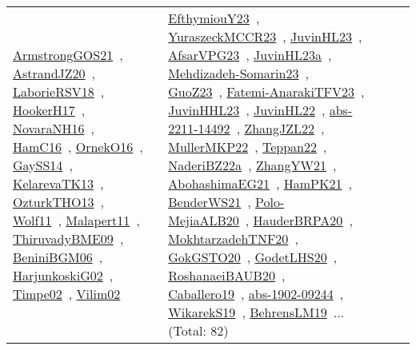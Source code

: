 {\begin{longtable}{lp{3cm}>{\raggedright\arraybackslash}p{6cm}>{\raggedright\arraybackslash}p{6cm}>{\raggedright\arraybackslash}p{8cm}}
\href{../works/ArmstrongGOS21.pdf}{ArmstrongGOS21}~\cite{ArmstrongGOS21}, \href{../works/AstrandJZ20.pdf}{AstrandJZ20}~\cite{AstrandJZ20}, \href{../works/LaborieRSV18.pdf}{LaborieRSV18}~\cite{LaborieRSV18}, \href{../works/HookerH17.pdf}{HookerH17}~\cite{HookerH17}, \href{../works/NovaraNH16.pdf}{NovaraNH16}~\cite{NovaraNH16}, \href{../works/HamC16.pdf}{HamC16}~\cite{HamC16}, \href{../works/OrnekO16.pdf}{OrnekO16}~\cite{OrnekO16}, \href{../works/GaySS14.pdf}{GaySS14}~\cite{GaySS14}, \href{../works/KelarevaTK13.pdf}{KelarevaTK13}~\cite{KelarevaTK13}, \href{../works/OzturkTHO13.pdf}{OzturkTHO13}~\cite{OzturkTHO13}, \href{../works/Wolf11.pdf}{Wolf11}~\cite{Wolf11}, \href{../works/Malapert11.pdf}{Malapert11}~\cite{Malapert11}, \href{../works/ThiruvadyBME09.pdf}{ThiruvadyBME09}~\cite{ThiruvadyBME09}, \href{../works/BeniniBGM06.pdf}{BeniniBGM06}~\cite{BeniniBGM06}, \href{../works/HarjunkoskiG02.pdf}{HarjunkoskiG02}~\cite{HarjunkoskiG02}, \href{../works/Timpe02.pdf}{Timpe02}~\cite{Timpe02}, \href{../works/Vilim02.pdf}{Vilim02}~\cite{Vilim02} & \href{../works/EfthymiouY23.pdf}{EfthymiouY23}~\cite{EfthymiouY23}, \href{../works/YuraszeckMCCR23.pdf}{YuraszeckMCCR23}~\cite{YuraszeckMCCR23}, \href{../works/JuvinHL23.pdf}{JuvinHL23}~\cite{JuvinHL23}, \href{../works/AfsarVPG23.pdf}{AfsarVPG23}~\cite{AfsarVPG23}, \href{../works/JuvinHL23a.pdf}{JuvinHL23a}~\cite{JuvinHL23a}, \href{../works/Mehdizadeh-Somarin23.pdf}{Mehdizadeh-Somarin23}~\cite{Mehdizadeh-Somarin23}, \href{../works/GuoZ23.pdf}{GuoZ23}~\cite{GuoZ23}, \href{../works/Fatemi-AnarakiTFV23.pdf}{Fatemi-AnarakiTFV23}~\cite{Fatemi-AnarakiTFV23}, \href{../works/JuvinHHL23.pdf}{JuvinHHL23}~\cite{JuvinHHL23}, \href{../works/JuvinHL22.pdf}{JuvinHL22}~\cite{JuvinHL22}, \href{../works/abs-2211-14492.pdf}{abs-2211-14492}~\cite{abs-2211-14492}, \href{../works/ZhangJZL22.pdf}{ZhangJZL22}~\cite{ZhangJZL22}, \href{../works/MullerMKP22.pdf}{MullerMKP22}~\cite{MullerMKP22}, \href{../works/Teppan22.pdf}{Teppan22}~\cite{Teppan22}, \href{../works/NaderiBZ22a.pdf}{NaderiBZ22a}~\cite{NaderiBZ22a}, \href{../works/ZhangYW21.pdf}{ZhangYW21}~\cite{ZhangYW21}, \href{../works/AbohashimaEG21.pdf}{AbohashimaEG21}~\cite{AbohashimaEG21}, \href{../works/HamPK21.pdf}{HamPK21}~\cite{HamPK21}, \href{../works/BenderWS21.pdf}{BenderWS21}~\cite{BenderWS21}, \href{../works/Polo-MejiaALB20.pdf}{Polo-MejiaALB20}~\cite{Polo-MejiaALB20}, \href{../works/HauderBRPA20.pdf}{HauderBRPA20}~\cite{HauderBRPA20}, \href{../works/MokhtarzadehTNF20.pdf}{MokhtarzadehTNF20}~\cite{MokhtarzadehTNF20}, \href{../works/GokGSTO20.pdf}{GokGSTO20}~\cite{GokGSTO20}, \href{../works/GodetLHS20.pdf}{GodetLHS20}~\cite{GodetLHS20}, \href{../works/RoshanaeiBAUB20.pdf}{RoshanaeiBAUB20}~\cite{RoshanaeiBAUB20}, \href{../works/Caballero19.pdf}{Caballero19}~\cite{Caballero19}, \href{../works/abs-1902-09244.pdf}{abs-1902-09244}~\cite{abs-1902-09244}, \href{../works/WikarekS19.pdf}{WikarekS19}~\cite{WikarekS19}, \href{../works/BehrensLM19.pdf}{BehrensLM19}~\cite{BehrensLM19}... (Total: 82)\\

\end{longtable}}
